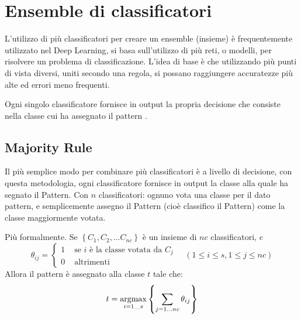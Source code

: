 \chapter{Ensemble di classificatori}\label{ensemble-di-classificatori}

L'utilizzo di più classificatori per creare un ensemble (insieme) è frequentemente utilizzato nel Deep Learning, si basa sull’utilizzo di più
reti, o modelli, per risolvere un problema di classificazione. L’idea di base è che utilizzando più punti di vista diversi, uniti secondo una regola, si possano raggiungere accuratezze
più alte ed errori meno frequenti.

Ogni singolo classificatore fornisce in output la propria decisione che consiste nella classe cui
ha assegnato il pattern \cite{unibo_maltoni_ml} \cite{zhi_enseble}. 

\section{Majority Rule}\label{majority-rule}

Il più semplice modo per combinare più classificatori è a livello
di decisione, con questa metodologia, ogni classificatore fornisce in output la classe alla quale ha segnato il Pattern.  Con \(n\) classificatori: ognuno vota una classe per il dato
pattern, e semplicemente  assegno il Pattern (cioè classifico il Pattern) come la classe maggiormente votata.

Più formalmente.
Se \( \left\{C_{1}, C_{2}, \ldots C_{n c}\right\} \) è un insieme di \( n c \) classificatori, \( e \)
\[
\theta_{i j}=\left\{\begin{array}{cc}
1 & \text { se } i \text { è la classe votata da } C_{j} \\
0 & \text { altrimenti }
\end{array} \quad(1 \leq i \leq s, 1 \leq j \leq n c)\right.
\]
Allora il pattern è assegnato alla classe \( t \) tale che:
\[
t=\operatornamewithlimits{argmax} _{i=1_{\ldots} s}\left\{\sum_{j=1 \ldots n c} \theta_{i j}\right\}
\]